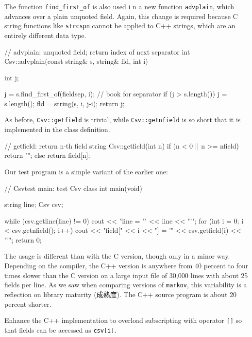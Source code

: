 The function \verb'find_first_of' is also used i n a new function
\verb'advplain', which advances over a plain unquoted field. Again, this
change is required because C string functions like \verb'strcspn' cannot be
applied to C++ strings, which are an entirely different data type.
\begin{wellcode}
    // advplain: unquoted field; return index of next separator
    int Csv::advplain(const string& s, string& fld, int i)
    {
        int j;

        j = s.find_first_of(fieldsep, i);   // book for separator
        if (j > s.length())
            j = s.length();
        fld = string(s, i, j-i);
        return j;
    }
\end{wellcode}

As before, \verb'Csv::getfield' is trivial, while \verb'Csv::getnfield' is
so short that it is implemented in the class definition.
\begin{wellcode}
    // getfield: return n-th field
    string Csv::getfield(int n)
    {
        if (n < 0 || n >= nfield)
            return "";
        else
            return field[n];
    }
\end{wellcode}

Our test program is a simple variant of the earlier one:
\begin{wellcode}
    // Csvtest main: test Csv class
    int main(void)
    {
        string  line;
        Csv     csv;

        while (csv.getline(line) != 0) {
            cout << "line = '" << line << "'\n";
            for (int i = 0; i < csv.getnfield(); i++)
                cout << "field[" << i << "] = '"
                    << csv.getfield(i) << "'\n";
        }
        return 0;
    }
\end{wellcode}

The usage is different than with the C version, though only in a minor way.
Depending on the compiler, the C++ version is anywhere from 40 percent to
four times slower than the C version on a large input file of 30,000 lines
with about 25 fields per line. As we saw when comparing versions of
\verb'markov', this variability is a reflection on library maturity
(成熟度). The C++ source program is about 20 percent shorter.

\begin{exercise}
    Enhance the C++ implementation to overload subscripting with operator
    \verb'[]' so that fields can be accessed as \verb'csv[i]'.
\end{exercise}

